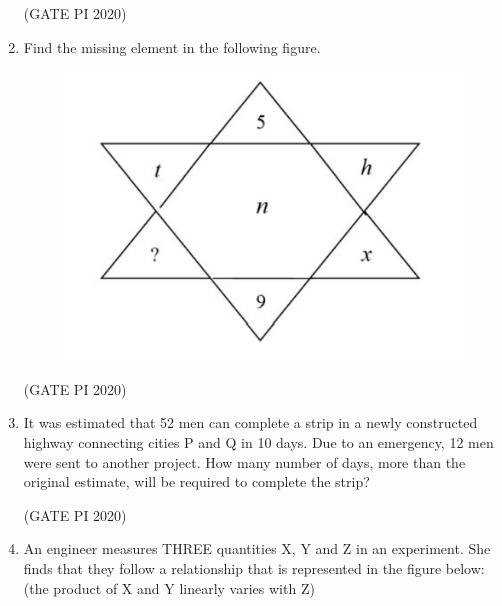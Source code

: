 \documentclass[journal,12pt,onecolumn]{IEEEtran}
\theoremstyle{remark}
\begin{document}
\begin{enumerate}
\hfill (GATE PI 2020)

\item Find the missing element in the following figure.

\begin{figure}[h]
    \centering
    \includegraphics[width=0.5\columnwidth]{figs/fig2.png}
    \caption{}
    \label{fig:placeholder}
\end{figure} 


\begin{enumerate}
\end{enumerate}

\hfill (GATE PI 2020)

\item It was estimated that 52 men can complete a strip in a newly constructed highway connecting cities P and Q in 10 days. Due to an emergency, 12 men were sent to another project. How many number of days, more than the original estimate, will be required to complete the strip?
\begin{enumerate}
\end{enumerate}

\hfill (GATE PI 2020)

\item An engineer measures THREE quantities X, Y and Z in an experiment. She finds that they follow a relationship that is represented in the figure below: (the product of X and Y linearly varies with Z)


\end{enumerate}
\end{document}
